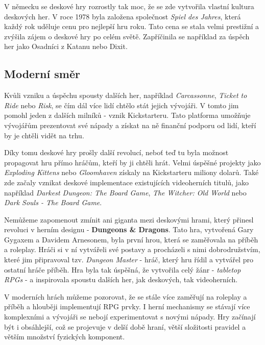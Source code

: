 V německu se deskové hry rozrostly tak moc, že se zde vytvořila vlastní kultura deskových her. V roce 1978 byla založena společnost \textit{Spiel des Jahres}, která každý rok uděluje cenu pro nejlepší hru roku. Tato cena se stala velmi prestižní a zvýšila zájem o deskové hry po celém světě. Zapříčinila se například za úspěch her jako Osadníci z Katanu nebo Dixit. \cite{attia_2018}

\subsection{Moderní směr}
\label{subsec:modern}

Kvůli vzniku a úspěchu spousty dalších her, například \textit{Carcassonne}, \textit{Ticket to Ride} nebo \textit{Risk}, se čím dál více lidí chtělo stát jejich vývojáři. V tomto jim pomohl jeden z dalších milníků - vznik Kickstarteru. Tato platforma umožňuje vývojářům prezentovat své nápady a získat na ně finanční podporu od lidí, kteří by je chtěli vidět na trhu.  \cite{attia_2018}

Díky tomu deskové hry prošly další revolucí, neboť teď tu byla možnost propagovat hru přímo hráčům, kteří by ji chtěli hrát. Velmi úspěšné projekty jako \textit{Exploding Kittens} nebo \textit{Gloomhaven} získaly na Kickstarteru miliony dolarů. Také zde začaly vznikat deskové implementace existujících videoherních titulů, jako například \textit{Darkest Dungeon: The Board Game}, \textit{The Witcher: Old World} nebo \textit{Dark Souls - The Board Game}. \cite{kickstarter}

Nemůžeme zapomenout zmínit ani giganta mezi deskovými hrami, který přinesl revoluci v herním designu - \textbf{Dungeons \& Dragons}. Tato hra, vytvořená Gary Gygaxem a Davidem Arnesonem, byla první hrou, která se zaměřovala na příběh a roleplay. Hráči si v ní vytvářeli své postavy a procházeli s nimi dobrodružstvím, které jim připravoval tzv. \textit{Dungeon Master} - hráč, který hru řídil a vytvářel pro ostatní hráče příběh. Hra byla tak úspěšná, že vytvořila celý žánr - \textit{tabletop RPGs} - a inspirovala spoustu dalších her, jak deskových, tak videoherních. \cite{dnd_beyond_2023}

V moderních hrách můžeme pozorovat, že se stále více zaměřují na roleplay a příběh a hlouběji implementují RPG prvky. I herní mechanismy se stávají více komplexními a vývojáři se nebojí experimentovat s novými nápady. Hry začínají být i obsáhlejší, což se projevuje v delší době hraní, větší složitosti pravidel a větším množství fyzických komponent.


